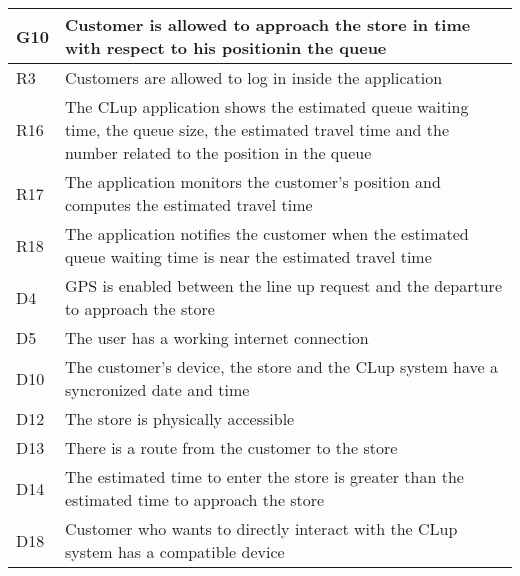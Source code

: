 \begin{center}
    {\renewcommand{\arraystretch}{1.5}
    \begin{longtable}{L{2cm}L{12cm}}
        \hline
        \textbf{G10} & \textbf{Customer is allowed to approach the store in time with respect to his positionin the queue} \\
        \hline
         R3 & Customers are allowed to log in inside the application \\
        \hline
         R16 & The CLup application shows the estimated queue waiting time, the queue size, the estimated travel time and the number related to the position in the queue \\
        \hline
         R17 & The application monitors the customer’s position and computes the estimated travel time \\
        \hline
         R18 & The application notifies the customer when the estimated queue waiting time is near the estimated travel time \\
        \hline
         D4 & GPS is enabled between the line up request and the departure to approach the store \\
        \hline
         D5 & The user has a working internet connection \\
        \hline
         D10 & The customer’s device, the store and the CLup system have a syncronized date and time \\
        \hline
         D12 & The store is physically accessible \\
        \hline
         D13 & There is a route from the customer to the store \\
        \hline
         D14 & The estimated time to enter the store is greater than the estimated time to approach the store \\
        \hline
         D18 & Customer who wants to directly interact with the CLup system has a compatible device \\
        \hline
    \end{longtable}}
\end{center}